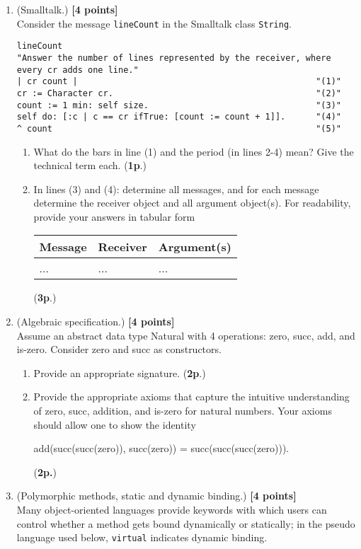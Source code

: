 \documentclass{article}
\begin{document}
\begin{enumerate}
\item (Smalltalk.) 
\hfill{\textbf{[4 points]}}
\\
Consider the message \texttt{lineCount} in the Smalltalk class \texttt{String}.

{\small 
\begin{verbatim}
lineCount 
"Answer the number of lines represented by the receiver, where 
every cr adds one line." 
| cr count |                                               "(1)"
cr := Character cr.                                        "(2)"
count := 1 min: self size.                                 "(3)"
self do: [:c | c == cr ifTrue: [count := count + 1]].      "(4)"
^ count                                                    "(5)"

\end{verbatim}
}
\begin{enumerate}
\item What do the bars in line (1) and the period (in lines 2-4) 
mean? Give the technical term each. (\textbf{1p}.)
\item In lines (3) and (4): determine all messages, and 
for each message determine the receiver object and all 
argument object(s). For readability,
provide your answers in tabular form
\begin{center}
\begin{tabular}{lll}
Message & Receiver & Argument(s) \\ \hline
...     & ...      & ...     \\
\end{tabular}
\end{center}   (\textbf{3p}.)
\end{enumerate} 

\item (Algebraic specification.)  \hfill{\textbf{[4 points]}}
\\
Assume an abstract data type Natural with 4 
operations: zero,
succ, add, and is-zero. Consider zero and succ as constructors.
\begin{enumerate}
\item Provide an appropriate signature. (\textbf{2p}.)
\item Provide the appropriate axioms  that capture the intuitive 
understanding of zero, succ, addition, and is-zero for natural numbers.
Your  axioms should allow one to show the identity

\begin{center}
{add(succ(succ(zero)), succ(zero)) = succ(succ(succ(zero)))}.
\end{center} 
(\textbf{2p.})
\end{enumerate}
\newpage
\item (Polymorphic methods, static and dynamic binding.)
\hfill{\textbf{[4 points]}}
\\
Many object-oriented languages provide keywords with which  
users can control whether a method gets bound dynamically or
statically; in the pseudo language used below, \texttt{virtual}
indicates dynamic binding. 


\end{enumerate}
\end{document}
